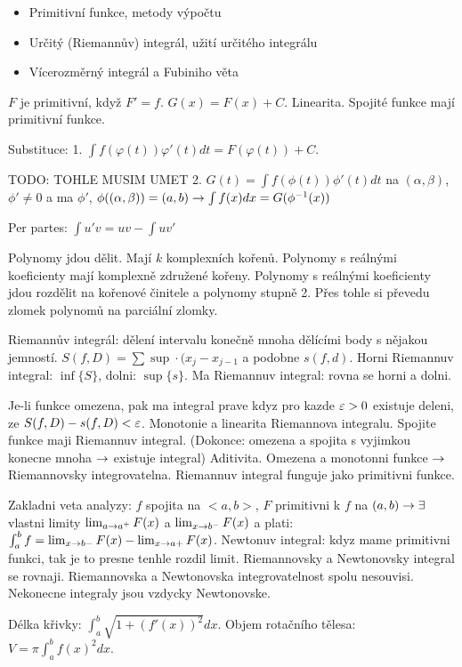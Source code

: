 \begin{itemize}
\item Primitivní funkce, metody výpočtu
\item Určitý (Riemannův) integrál, užití určitého integrálu
\item Vícerozměrný integrál a Fubiniho věta
\end{itemize}

$F$ je primitivní, když $F'=f$. $G(x)=F(x)+C$. Linearita.
Spojité funkce mají primitivní funkce.

Substituce: 1. $\int f(\varphi(t))\varphi'(t)dt=F(\varphi(t))+C$.

TODO: TOHLE MUSIM UMET
2. $G(t)=\int f(\phi(t))\phi'(t)dt$ na $(\alpha,\beta)$, $\phi'\neq 0$ a ma
	$\phi'$, $\phi((\alpha,\beta))=(a,b) \rightarrow \int f(x) dx=G(\phi^{-1}(x))$

Per partes: $\int u'v=uv-\int uv'$

Polynomy jdou dělit. Mají $k$ komplexních kořenů.
Polynomy s reálnými koeficienty mají komplexně združené kořeny.
Polynomy s reálnými koeficienty jdou rozdělit na kořenové činitele
a polynomy stupně 2. Přes tohle si převedu zlomek polynomů na parciální zlomky.

Riemannův integrál: dělení intervalu konečně mnoha dělícími body s nějakou
jemností. $S(f,D)=\sum \sup \cdot (x_j-x_{j-1}$ a podobne $s(f,d)$.
Horni Riemannuv integral: $\inf\{S\}$, dolni: $\sup\{s\}$.
Ma Riemannuv integral: rovna se horni a dolni.

Je-li funkce omezena, pak ma integral prave kdyz pro kazde $\varepsilon>0$
existuje deleni, ze $S(f,D)-s(f,D)<\varepsilon$.
Monotonie a linearita Riemannova integralu.
Spojite funkce maji Riemannuv integral. (Dokonce: omezena a spojita s vyjimkou
konecne mnoha $\rightarrow$ existuje integral)
Aditivita.
Omezena a monotonni funkce $\rightarrow$ Riemannovsky integrovatelna.
Riemannuv integral funguje jako primitivni funkce.

Zakladni veta analyzy: $f$ spojita na $<a,b>$, $F$ primitivni k $f$ na
$(a,b)\rightarrow\exists$ vlastni limity $\lim_{a\rightarrow a^+}F(x)$ a $\lim_{x\rightarrow b^-}F(x)$
a plati: $\int_a^b f=\lim_{x\rightarrow b-}F(x)-\lim_{x\rightarrow a+}F(x)$.
Newtonuv integral: kdyz mame primitivni funkci, tak je to presne tenhle rozdil
limit. Riemannovsky a Newtonovsky integral se rovnaji. Riemannovska a
Newtonovska integrovatelnost spolu nesouvisi.
Nekonecne integraly jsou vzdycky Newtonovske.

Délka křivky: $\int_a^b \sqrt{1+(f'(x))^2}dx$.
Objem rotačního tělesa: $V=\pi\int_a^b f(x)^2 dx$.

